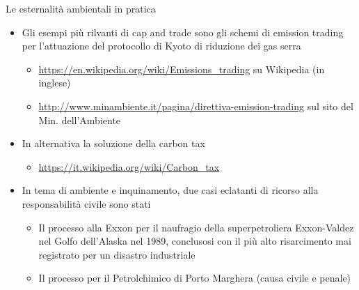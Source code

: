 \documentclass[aspectratio=64,11pt]{beamer}
\begin{document}
\begin{frame}{Le esternalità ambientali in pratica}
\begin{itemize}
\item Gli esempi più rilvanti di \alert{cap and trade} sono gli schemi di \alert{emission trading} per l'attuazione del protocollo di Kyoto di riduzione dei gas serra
\begin{itemize}
\item \url{https://en.wikipedia.org/wiki/Emissions\_trading} su Wikipedia (in inglese)
\item \url{http://www.minambiente.it/pagina/direttiva-emission-trading} sul sito del
Min. dell'Ambiente
\end{itemize}
\item In alternativa la soluzione della \alert{carbon tax}
\begin{itemize}
\item \url{https://it.wikipedia.org/wiki/Carbon\_tax}
\end{itemize}
\item In tema di ambiente e inquinamento, due casi eclatanti di ricorso alla responsabilità civile sono stati
\begin{itemize}
\item Il processo alla Exxon per il naufragio della superpetroliera Exxon-Valdez nel Golfo dell'Alaska nel 1989, conclusosi con il più alto risarcimento mai registrato per un disastro industriale
\item Il processo per il Petrolchimico di Porto Marghera (causa civile e penale)
\end{itemize}
\end{itemize}
\end{frame}
\end{document}
